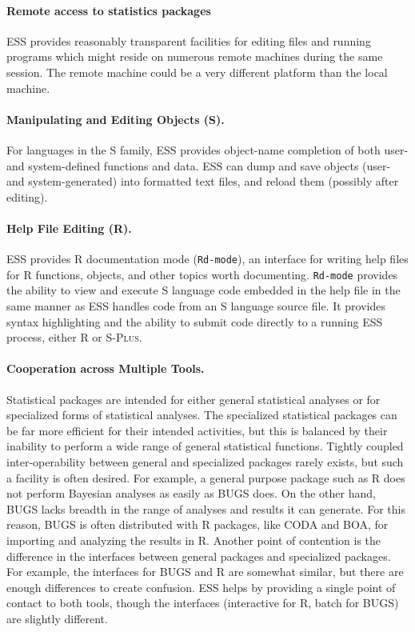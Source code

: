 \documentclass{article}
\newcommand*{\Splus}{\textsc{S-Plus}}
\newcommand{\stexttt}[1]{{\small\texttt{#1}}}
\begin{document}
\paragraph{Remote access to statistics packages}
ESS provides reasonably transparent facilities for editing files and
running programs which might reside on numerous remote machines during the
same session.  The remote machine could be a very different platform
than the local machine.

\paragraph{Manipulating and Editing Objects (S).}
For languages in the S family, ESS provides object-name completion of
both user- and system-defined functions and data.  ESS can dump and
save objects (user- and system-generated) into formatted text files,
and reload them (possibly after editing).

\paragraph{Help File Editing (R).}
ESS provides R documentation mode (\stexttt{Rd-mode}), an interface
for writing help files for R functions, objects, and other topics
worth documenting.  \stexttt{Rd-mode} provides the ability to view and
execute S language code embedded in the help file in the same manner
as ESS handles code from an S language source file.  It provides
syntax highlighting and the ability to submit code directly to a
running ESS process, either R or \Splus.

\paragraph{Cooperation across Multiple Tools.}
Statistical packages are intended for either general statistical
analyses or for specialized forms of statistical analyses.  The
specialized statistical packages can be far more efficient for their
intended activities, but this is balanced by their inability to
perform a wide range of general statistical functions.  Tightly
coupled inter-operability between general and specialized packages
rarely exists, but such a facility is often desired.  For example, a
general purpose package such as R does not perform Bayesian analyses
as easily as BUGS does.  On the other hand, BUGS lacks breadth in the
range of analyses and results it can generate.  For this reason, BUGS
is often distributed with R packages, like CODA and BOA, for importing
and analyzing the results in R.  Another point of contention is the
difference in the interfaces between general packages and specialized
packages.  For example, the interfaces for BUGS and R are somewhat
similar, but there are enough differences to create confusion.  ESS
helps by providing a single point of contact to both tools, though the
interfaces (interactive for R, batch for BUGS) are slightly different.
\end{document}
